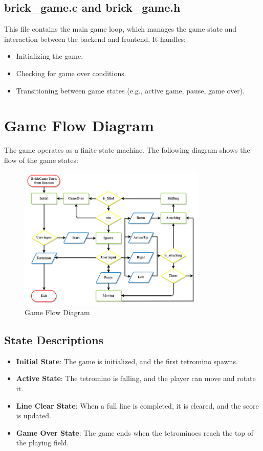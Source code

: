\documentclass{article}
\begin{document}
\subsection{brick\_game.c and brick\_game.h}
This file contains the main game loop, which manages the game state and interaction between the backend and frontend. It handles:
\begin{itemize}
    \item Initializing the game.
    \item Checking for game over conditions.
    \item Transitioning between game states (e.g., active game, pause, game over).
\end{itemize}

\section{Game Flow Diagram}
The game operates as a finite state machine. The following diagram shows the flow of the game states:

\begin{figure}[h]
    \centering
    \includegraphics[width=0.8\textwidth]{docs/Diagrama.png}
    \caption{Game Flow Diagram}
    \label{fig:diagram}
\end{figure}

\subsection{State Descriptions}
\begin{itemize}
    \item \textbf{Initial State}: The game is initialized, and the first tetromino spawns.
    \item \textbf{Active State}: The tetromino is falling, and the player can move and rotate it.
    \item \textbf{Line Clear State}: When a full line is completed, it is cleared, and the score is updated.
    \item \textbf{Game Over State}: The game ends when the tetrominoes reach the top of the playing field.
\end{itemize}
\end{document}
